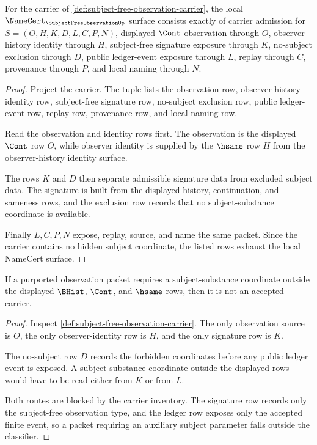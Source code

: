 \begin{theorem}
\label{thm:subject-free-observation-namecert-obligations}
For the carrier of \autoref{def:subject-free-observation-carrier}, the local $\NameCert_{\SubjectFreeObservationUp}$ surface consists exactly of carrier admission for $S=(O,H,K,D,L,C,P,N)$, displayed $\Cont$ observation through $O$, observer-history identity through $H$, subject-free signature exposure through $K$, no-subject exclusion through $D$, public ledger-event exposure through $L$, replay through $C$, provenance through $P$, and local naming through $N$.
\end{theorem}
\begin{proof}
Project the carrier. The tuple lists the observation row, observer-history identity row, subject-free signature row, no-subject exclusion row, public ledger-event row, replay row, provenance row, and local naming row.

Read the observation and identity rows first. The observation is the displayed $\Cont$ row $O$, while observer identity is supplied by the $\hsame$ row $H$ from the observer-history identity surface.

The rows $K$ and $D$ then separate admissible signature data from excluded subject data. The signature is built from the displayed history, continuation, and sameness rows, and the exclusion row records that no subject-substance coordinate is available.

Finally $L,C,P,N$ expose, replay, source, and name the same packet. Since the carrier contains no hidden subject coordinate, the listed rows exhaust the local NameCert surface.
\end{proof}

\begin{theorem}
\label{thm:subject-free-observation-no-subject-parameter}
If a purported observation packet requires a subject-substance coordinate outside the displayed $\BHist$, $\Cont$, and $\hsame$ rows, then it is not an accepted \SubjectFreeObservationUp carrier.
\end{theorem}
\begin{proof}
Inspect \autoref{def:subject-free-observation-carrier}. The only observation source is $O$, the only observer-identity row is $H$, and the only signature row is $K$.

The no-subject row $D$ records the forbidden coordinates before any public ledger event is exposed. A subject-substance coordinate outside the displayed rows would have to be read either from $K$ or from $L$.

Both routes are blocked by the carrier inventory. The signature row records only the subject-free observation type, and the ledger row exposes only the accepted finite event, so a packet requiring an auxiliary subject parameter falls outside the classifier.
\end{proof}

